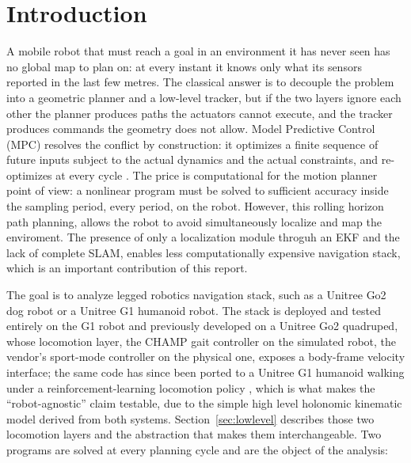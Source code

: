 \documentclass[11pt,a4paper]{article}
\begin{document}
\vspace{6pt}

\newpage
\section{Introduction}
\label{sec:intro}

A mobile robot that must reach a goal in an environment it has never seen has no global map to plan on: at
every instant it knows only what its sensors reported in the last few metres. The classical answer is to
decouple the problem into a geometric planner and a low-level tracker, but if the two layers ignore each
other the planner produces paths the actuators cannot execute, and the tracker produces commands the geometry
does not allow. Model Predictive Control (MPC) resolves the conflict by construction: it optimizes a finite
sequence of future inputs subject to the actual dynamics and the actual constraints, and re-optimizes at every
cycle \cite{rawlings2017mpc}. The price is computational for the motion planner point of view: a nonlinear program must be solved to sufficient
accuracy inside the sampling period, every period, on the robot. However, this rolling horizon path planning, allows the robot to avoid simultaneously localize and map the enviroment. The presence of only a localization module throguh an EKF and the lack of complete SLAM, enables less computationally expensive navigation stack, which is an important contribution of this report.

The goal is to analyze legged robotics navigation stack, such as a Unitree Go2 dog robot or a Unitree G1 humanoid robot. The stack is deployed and tested entirely on the G1 robot and previously developed on a Unitree Go2
quadruped, whose locomotion layer, the CHAMP gait controller \cite{champ} on the simulated robot, the
vendor's sport-mode controller on the physical one, exposes a body-frame velocity interface; the same code
has since been ported to a Unitree G1 humanoid walking under a reinforcement-learning locomotion policy
\cite{li2025amo}, which is what makes the ``robot-agnostic'' claim testable, due to the simple high level
holonomic kinematic model derived from both systems. Section~\ref{sec:lowlevel} describes those two
locomotion layers and the abstraction that makes them interchangeable. Two programs are
solved at every planning cycle and are the object of the analysis:
\end{document}
